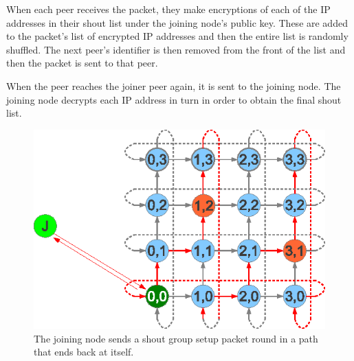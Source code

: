 \documentclass[ %
                    author={Luke Murray},
                supervisor={Dr. Simon Hollis},
                     title={Shadow Peer-to-Peer Networks},
                  subtitle={},
                    degree={MEng},
                      year={2013} ]{thesis}
\begin{document}
When each peer receives the packet, they make encryptions of each of the IP addresses in their shout list under the joining node's public key. These are added to the packet's list of encrypted IP addresses and then the entire list is randomly shuffled. The next peer's identifier is then removed from the front of the list and then the packet is sent to that peer.

When the peer reaches the joiner peer again, it is sent to the joining node. The joining node decrypts each IP address in turn in order to obtain the final shout list.

\begin{figure}[h]
    \centering
    \includegraphics{diagrams/create_shout_group_setup.eps}
    \caption{The joining node sends a shout group setup packet round in a path that ends back at itself.}
    \label{create_shout_group_setup}
\end{figure}
\end{document}
